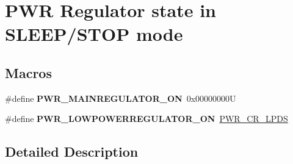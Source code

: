 \hypertarget{group___p_w_r___regulator__state__in___s_t_o_p__mode}{}\section{P\+WR Regulator state in S\+L\+E\+E\+P/\+S\+T\+OP mode}
\label{group___p_w_r___regulator__state__in___s_t_o_p__mode}
\subsection*{Macros}
\begin{DoxyCompactItemize}
\item 
\mbox{\label{group___p_w_r___regulator__state__in___s_t_o_p__mode_ga1d5b4e1482184286e28c16162f530039}} 
\#define {\bfseries P\+W\+R\+\_\+\+M\+A\+I\+N\+R\+E\+G\+U\+L\+A\+T\+O\+R\+\_\+\+ON}~0x00000000U
\item 
\mbox{\label{group___p_w_r___regulator__state__in___s_t_o_p__mode_gab9922a15f8414818d736d5e7fcace963}} 
\#define {\bfseries P\+W\+R\+\_\+\+L\+O\+W\+P\+O\+W\+E\+R\+R\+E\+G\+U\+L\+A\+T\+O\+R\+\_\+\+ON}~\hyperlink{group___peripheral___registers___bits___definition_ga3aeb8d6f2539b0a3a4b851aeba0eea66}{P\+W\+R\+\_\+\+C\+R\+\_\+\+L\+P\+DS}
\end{DoxyCompactItemize}


\subsection{Detailed Description}
